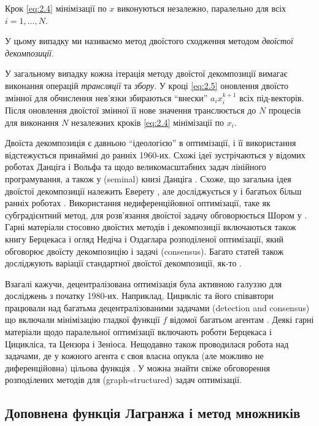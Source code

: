 Крок \eqref{eq:2.4} мінімізації по $x$ виконуються незалежно, паралельно для всіх $i = 1, \ldots, N$.

\begin{definition}
    У цьому випадку ми називаємо метод двоїстого сходження методом \textit{двоїстої декомпозиції}.
\end{definition}

У загальному випадку кожна ітерація методу двоїстої декомпозиції вимагає виконання операцій \textit{трансляції} та \textit{збору}. У кроці \eqref{eq:2.5} оновлення двоїсто змінної для обчислення нев'язки збираються ``внески'' $a_i x_i^{k + 1}$ всіх під-векторів. Після оновлення двоїстої змінної її нове значення транслюється до $N$ процесів для виконання $N$ незалежних кроків \eqref{eq:2.4} мінімізації по $x_i$. \medskip

Двоїста декомпозиція є давньою ``ідеологією'' в оптимізації, і її використання відстежується принаймні до ранніх 1960-их. Схожі ідеї зустрічаються у відомих роботах Данціга і Вольфа \cite{44} та \cite{13} щодо великомасштабних задач лінійного програмування, а також у (seminal) книзі Данціга \cite{43}. Схоже, що загальна ідея двоїстої декомпозиції належить Еверету \cite{69}, але досліджується у і багатьох більш ранніх роботах \cite{107, 84, 117, 14}. Використання недиференційовної оптимізації, таке як субградієнтний метод, для розв'язання двоїстої задачу обговорюється Шором у \cite{152}. Гарні матеріали стосовно двоїстих методів і декомпозиції включаються також книгу Берцекаса \cite[глава 6]{16} і огляд Недіча і Оздаглара \cite{131} розподіленої оптимізації, який обговорює двоїсту декомпозицію і задачі (consensus). Багато статей також досліджують варіації стандартної двоїстої декомпозиції, як-то \cite{129}. \medskip

Взагалі кажучи, децентралізована оптимізація була активною галуззю для досліджень з початку 1980-их. Наприклад, Цицикліс та його співавтори працювали над багатьма децентралізованими задачами (detection and consensus) що включали мінімізацію гладкої функції $f$ відомої багатьом агентам \cite{160, 161, 17}. Деякі гарні матеріали щодо паралельної оптимізації включають роботи \cite{17} Берцекаса і Цицикліса, та \cite{31} Цензора і Зеніоса. Нещодавно також проводилася робота над задачами, де у кожного агента є своя власна опукла (але можливо не диференційовна) цільова функція \cite{130}. У \cite{54} можна знайти свіже обговорення розподілених методів для (graph-structured) задач оптимізації.

\subsection{Доповнена функція Лагранжа і метод множників}

